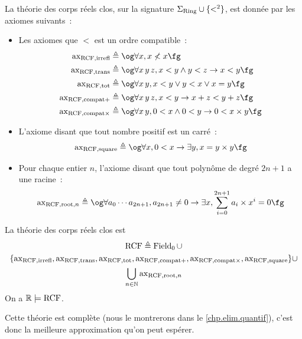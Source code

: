 \begin{definition}
  La théorie des corps réels clos, sur la signature $\Sigma_{\operatorname{Ring}}\cup\{<^2\}$,
  est donnée par les axiomes suivants~:
  \begin{itemize}
  \item Les axiomes que $<$ est un ordre compatible~:
    \begin{align*}
      \Rax_{\RCF,\irrefl} &\defeq \ogM \forall x, x\nless x\fgM\\
      \Rax_{\RCF,\trans} &\defeq
      \ogM \forall x\,y\,z, x < y \land y < z \to x < y\fgM\\
      \Rax_{\RCF,\tot} &\defeq
      \ogM\forall x\,y, x < y \lor y < x \lor x = y \fgM\\
      \Rax_{\RCF,\mathord{\compat}\mathord{+}} &\defeq
      \ogM \forall x\,y\,z, x < y \to x + z < y + z\fgM\\
      \Rax_{\RCF,\mathord{\compat}\mathord{\times}} &\defeq
      \ogM \forall x\,y, 0 < x \land 0 < y \to 0 < x\times y\fgM
    \end{align*}
  \item L'axiome disant que tout nombre positif est un carré~:
    \[\Rax_{\RCF,\squar} \defeq
    \ogM \forall x, 0 < x \to \exists y, x = y\times y\fgM\]
  \item Pour chaque entier $n$, l'axiome disant que tout polynôme de degré
    $2n+1$ a une racine~:
    \[\Rax_{\RCF,\raci,n}\defeq
    \ogM \forall a_0\cdots a_{2n+1}, a_{2n+1}\neq 0 \to
    \exists x, \sum_{i = 0}^{2n+1} a_i\times x^i = 0\fgM\]
  \end{itemize}
  La théorie des corps réels clos est
  \begin{multline*}
    \operatorname{RCF}\triangleq\operatorname{Field}_0\cup
    \\\{\operatorname{ax}_{\operatorname{RCF},\operatorname{irrefl}},\operatorname{ax}_{\operatorname{RCF},\operatorname{trans}},\operatorname{ax}_{\operatorname{RCF},\operatorname{tot}},
    \operatorname{ax}_{\operatorname{RCF},\mathord{\operatorname{compat}}\mathord{+}},\operatorname{ax}_{\operatorname{RCF},\mathord{\operatorname{compat}}\mathord{\times}},
    \operatorname{ax}_{\operatorname{RCF},\operatorname{square}}\} \cup
    \\\bigcup_{n \in \mathbb N}\operatorname{ax}_{\operatorname{RCF},\operatorname{root},n}
  \end{multline*}
  On a $\mathbb R\models\operatorname{RCF}$.
\end{definition}

Cette théorie est complète (nous le montrerons dans le
\cref{chp.elim.quantif}), c'est donc la meilleure approximation
qu'on peut espérer.

